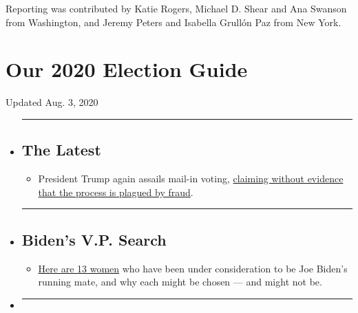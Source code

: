 Reporting was contributed by Katie Rogers, Michael D. Shear and Ana
Swanson from Washington, and Jeremy Peters and Isabella Grullón Paz from
New York.

\hypertarget{our-2020-election-guide}{%
\section{Our 2020 Election Guide}\label{our-2020-election-guide}}

Updated Aug. 3, 2020

\begin{itemize}
\item
  \begin{center}\rule{0.5\linewidth}{\linethickness}\end{center}

  \hypertarget{the-latest}{%
  \subsection{The Latest}\label{the-latest}}

  \begin{itemize}
  \tightlist
  \item
    President Trump again assails mail-in voting,
    \href{https://www.nytimes.com/2020/08/03/us/politics/trump-mail-in-voting.html?action=click\&pgtype=Article\&state=default\&region=BELOW_MAIN_CONTENT\&context=storylines_guide}{claiming
    without evidence that the process is plagued by fraud}.
  \end{itemize}
\item
  \begin{center}\rule{0.5\linewidth}{\linethickness}\end{center}

  \hypertarget{bidens-vp-search}{%
  \subsection{Biden's V.P. Search}\label{bidens-vp-search}}

  \begin{itemize}
  \tightlist
  \item
    \href{https://www.nytimes.com/article/biden-vice-president-2020.html?action=click\&pgtype=Article\&state=default\&region=BELOW_MAIN_CONTENT\&context=storylines_guide}{Here
    are 13 women} who have been under consideration to be Joe Biden's
    running mate, and why each might be chosen --- and might not be.
  \end{itemize}
\item
  \begin{center}\rule{0.5\linewidth}{\linethickness}\end{center}


\end{itemize}
